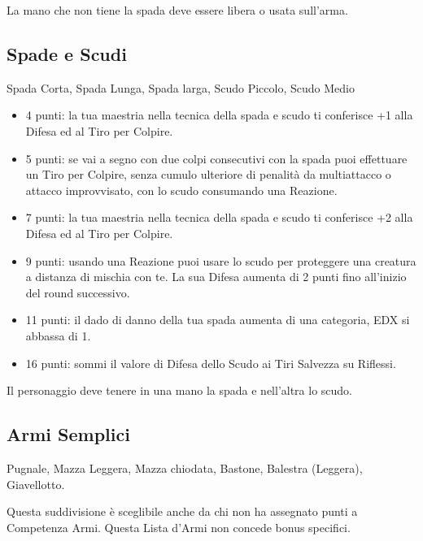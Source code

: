 \begin{multicols}{2}
\begin{itemize}[leftmargin=*]
La mano che non tiene la spada deve essere libera o usata sull'arma.

\end{itemize}

\subsection{Spade e Scudi} Spada Corta, Spada Lunga, Spada larga, Scudo Piccolo, Scudo Medio\label{listaarmispadescudi}

\begin{itemize}[leftmargin=*] \setlength{\itemsep}{0pt}

\item 4 punti: la tua maestria nella tecnica della spada e scudo ti conferisce +1 alla Difesa ed al Tiro per Colpire.
\item 5 punti: se vai a segno con due colpi consecutivi con la spada puoi effettuare un Tiro per Colpire, senza cumulo ulteriore di penalità da multiattacco o attacco improvvisato, con lo scudo consumando una Reazione.
\item 7 punti: la tua maestria nella tecnica della spada e scudo ti conferisce +2 alla Difesa ed al Tiro per Colpire.
\item 9 punti: usando una Reazione puoi usare lo scudo per proteggere una creatura a distanza di mischia con te. La sua Difesa aumenta di 2 punti fino all'inizio del round successivo.
\item 11 punti: il dado di danno della tua spada aumenta di una categoria, EDX si abbassa di 1.
\item 16 punti: sommi il valore di Difesa dello Scudo ai Tiri Salvezza su Riflessi.

\end{itemize}

Il personaggio deve tenere in una mano la spada e nell'altra lo scudo.

\subsection{Armi Semplici} Pugnale, Mazza Leggera, Mazza chiodata, Bastone, Balestra (Leggera), Giavellotto.\hypertarget{armi.semplici}{}\label{listaarmisemplice}

\medskip

Questa suddivisione è sceglibile anche da chi non ha assegnato punti a Competenza Armi. Questa Lista d'Armi non concede bonus specifici.


\end{multicols}
